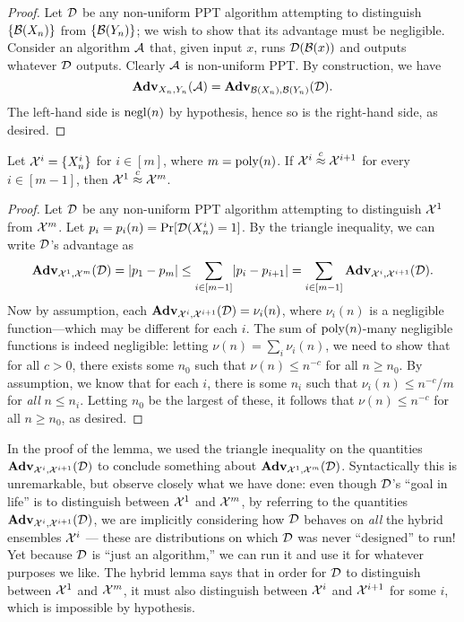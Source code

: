 \documentclass[11pt]{article}
\begin{document}
\begin{proof}
  Let $\mathcal{D}$ be any non-uniform PPT algorithm attempting to
  distinguish $\{\mathcal{B}(X_{n})\}$ from $\{\mathcal{B}(Y_{n})\}$; we wish
  to show that its advantage must be negligible.  Consider an
  algorithm $\mathcal{A}$ that, given input $x$, runs $\mathcal{D}(\mathcal{B}(x))$ and
  outputs whatever $\mathcal{D}$ outputs.  Clearly $\mathcal{A}$ is non-uniform
  PPT.  By construction, we have \[ \mathbf{Adv}_{X_{n},Y_{n}}(\mathcal{A}) =
  \mathbf{Adv}_{\mathcal{B}(X_{n}),\mathcal{B}(Y_{n})}(\mathcal{D}).
   \] The left-hand side is $\operatorname{negl}(n)$ by hypothesis, hence so is the
   right-hand side, as desired.
\end{proof}

\begin{lemma}
  \label{lem:hybrid}
  Let $\mathcal{X}^{i} = \{X^{i}_{n}\}$ for $i \in [m]$, where
  $m=\operatorname{poly}(n)$.  If $\mathcal{X}^{i} \stackrel{c}{\approx} \mathcal{X}^{i+1}$ for every $i \in
  [m-1]$, then $\mathcal{X}^{1} \stackrel{c}{\approx} \mathcal{X}^{m}$.
\end{lemma}

\begin{proof}
  Let $\mathcal{D}$ be any non-uniform PPT algorithm attempting to
  distinguish $\mathcal{X}^{1}$ from $\mathcal{X}^{m}$.  Let $p_{i} = p_{i}(n) =
  \Pr[\mathcal{D}(X^{i}_{n}) = 1]$.  By the triangle inequality, we can
  write $\mathcal{D}$'s advantage as
  \[ \mathbf{Adv}_{\mathcal{X}^{1},\mathcal{X}^{m}}(\mathcal{D}) = \lvert p_{1} - p_{m}\rvert \leq
  \sum_{i \in [m-1]} \lvert p_{i} - p_{i+1}\rvert = \sum_{i \in [m-1]}
  \mathbf{Adv}_{\mathcal{X}^{i}, \mathcal{X}^{i+1}}(\mathcal{D}). \] Now by assumption, each
  $\mathbf{Adv}_{\mathcal{X}^{i}, \mathcal{X}^{i+1}}(\mathcal{D}) = \nu_{i}(n)$, where
  $\nu_{i}(n)$ is a negligible function---which may be different for
  each $i$.  The sum of $\operatorname{poly}(n)$-many negligible functions is indeed
  negligible: letting $\nu(n) = \sum_{i} \nu_{i}(n)$, we need to show
  that for all $c > 0$, there exists some $n_{0}$ such that $\nu(n)
  \leq n^{-c}$ for all $n \geq n_{0}$.  By assumption, we know that
  for each $i$, there is some $n_{i}$ such that $\nu_{i}(n) \leq
  n^{-c}/m$ for \emph{all} $n \leq n_{i}$.  Letting $n_{0}$ be the
  largest of these, it follows that $\nu(n) \leq n^{-c}$ for all $n
  \geq n_{0}$, as desired.
\end{proof}

\begin{remark}
  In the proof of the lemma, we used the triangle inequality on the
  quantities $\mathbf{Adv}_{\mathcal{X}^{i},\mathcal{X}^{i+1}}(\mathcal{D})$ to conclude
  something about $\mathbf{Adv}_{\mathcal{X}^{1}, \mathcal{X}^{m}}(\mathcal{D})$.
  Syntactically this is unremarkable, but observe closely what we have
  done: even though $\mathcal{D}$'s ``goal in life'' is to distinguish
  between $\mathcal{X}^{1}$ and $\mathcal{X}^{m}$, by referring to the quantities
  $\mathbf{Adv}_{\mathcal{X}^{i},\mathcal{X}^{i+1}}(\mathcal{D})$, we are implicitly
  considering how $\mathcal{D}$ behaves on \emph{all} the hybrid ensembles
  $\mathcal{X}^{i}$ --- these are distributions on which $\mathcal{D}$ was never
  ``designed'' to run!  Yet because $\mathcal{D}$ is ``just an algorithm,''
  we can run it and use it for whatever purposes we like.  The hybrid
  lemma says that in order for $\mathcal{D}$ to distinguish between
  $\mathcal{X}^{1}$ and $\mathcal{X}^{m}$, it must also distinguish between
  $\mathcal{X}^{i}$ and $\mathcal{X}^{i+1}$ for some $i$, which is impossible by
  hypothesis.
\end{remark}
\end{document}
